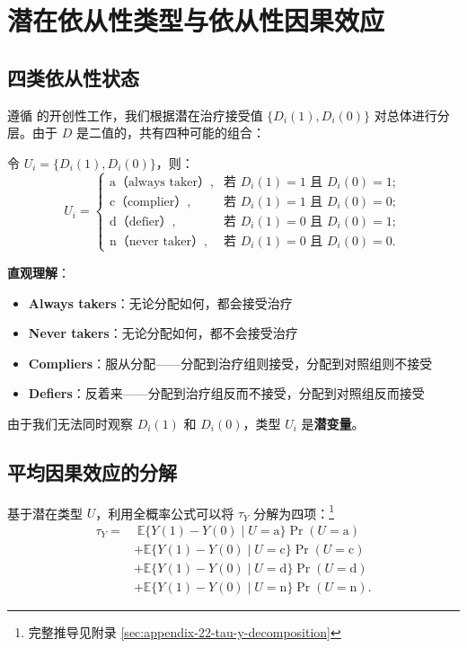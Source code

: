 \section{潜在依从性类型与依从性因果效应}\label{sec:22-latent-compliance}

\subsection{四类依从性状态}\label{sec:22-compliance-types}

遵循 \citet{ImbensAngrist:1994} 的开创性工作，我们根据潜在治疗接受值 $\{D_i(1), D_i(0)\}$ 对总体进行分层。由于 $D$ 是二值的，共有四种可能的组合：

\begin{Definition}[依从性类型]\label{def:22-compliance-types}
令 $U_i = \{D_i(1), D_i(0)\}$，则：
\[
U_i =
\begin{cases}
\text{a（always taker）}, & \text{若 } D_i(1) = 1 \text{ 且 } D_i(0) = 1; \\
\text{c（complier）}, & \text{若 } D_i(1) = 1 \text{ 且 } D_i(0) = 0; \\
\text{d（defier）}, & \text{若 } D_i(1) = 0 \text{ 且 } D_i(0) = 1; \\
\text{n（never taker）}, & \text{若 } D_i(1) = 0 \text{ 且 } D_i(0) = 0.
\end{cases}
\]
\end{Definition}

\textbf{直观理解}：
\begin{itemize}
  \item \textbf{Always takers}：无论分配如何，都会接受治疗
  \item \textbf{Never takers}：无论分配如何，都不会接受治疗
  \item \textbf{Compliers}：服从分配——分配到治疗组则接受，分配到对照组则不接受
  \item \textbf{Defiers}：反着来——分配到治疗组反而不接受，分配到对照组反而接受
\end{itemize}

由于我们无法同时观察 $D_i(1)$ 和 $D_i(0)$，类型 $U_i$ 是\textbf{潜变量}。

\subsection{平均因果效应的分解}\label{sec:22-decomposition}

基于潜在类型 $U$，利用全概率公式可以将 $\tau_Y$ 分解为四项：\footnote{完整推导见附录 \cref{sec:appendix-22-tau-y-decomposition}}
\[
\begin{aligned}
\tau_Y = & \; \mathbb{E}\{Y(1) - Y(0) \mid U = \text{a}\} \Pr(U = \text{a}) \\
& + \mathbb{E}\{Y(1) - Y(0) \mid U = \text{c}\} \Pr(U = \text{c}) \\
& + \mathbb{E}\{Y(1) - Y(0) \mid U = \text{d}\} \Pr(U = \text{d}) \\
& + \mathbb{E}\{Y(1) - Y(0) \mid U = \text{n}\} \Pr(U = \text{n}).
\label{eq:22-tau-y-decomposition}
\end{aligned}
\]

